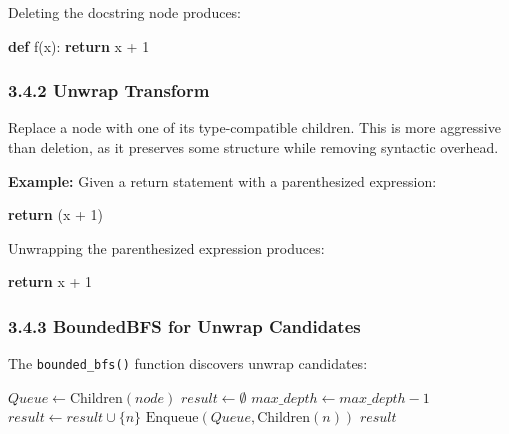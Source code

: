 \documentclass[
  letterpaper,
]{article}
\newenvironment{Shaded}{\begin{snugshade}}{\end{snugshade}}
\newcommand{\ControlFlowTok}[1]{\textcolor[rgb]{0.00,0.23,0.31}{\textbf{#1}}}
\newcommand{\DecValTok}[1]{\textcolor[rgb]{0.68,0.00,0.00}{#1}}
\newcommand{\KeywordTok}[1]{\textcolor[rgb]{0.00,0.23,0.31}{\textbf{#1}}}
\newcommand{\NormalTok}[1]{\textcolor[rgb]{0.00,0.23,0.31}{#1}}
\newcommand{\OperatorTok}[1]{\textcolor[rgb]{0.37,0.37,0.37}{#1}}
\begin{document}
Deleting the docstring node produces:

\begin{Shaded}
\begin{Highlighting}[]
\KeywordTok{def}\NormalTok{ f(x):}
    \ControlFlowTok{return}\NormalTok{ x }\OperatorTok{+} \DecValTok{1}
\end{Highlighting}
\end{Shaded}

\subsubsection{3.4.2 Unwrap Transform}\label{unwrap-transform}

Replace a node with one of its type-compatible children. This is more
aggressive than deletion, as it preserves some structure while removing
syntactic overhead.

\textbf{Example:} Given a return statement with a parenthesized
expression:

\begin{Shaded}
\begin{Highlighting}[]
\ControlFlowTok{return}\NormalTok{ (x }\OperatorTok{+} \DecValTok{1}\NormalTok{)}
\end{Highlighting}
\end{Shaded}

Unwrapping the parenthesized expression produces:

\begin{Shaded}
\begin{Highlighting}[]
\ControlFlowTok{return}\NormalTok{ x }\OperatorTok{+} \DecValTok{1}
\end{Highlighting}
\end{Shaded}

\subsubsection{3.4.3 BoundedBFS for Unwrap
Candidates}\label{boundedbfs-for-unwrap-candidates}

The \texttt{bounded\_bfs()} function discovers unwrap candidates:

\begin{algorithm}
\caption{BoundedBFS}
\begin{algorithmic}[1]
  \State $Queue \gets \text{Children}(node)$
  \State $result \gets \emptyset$
    \State $max\_depth \gets max\_depth - 1$
        \State $result \gets result \cup \{n\}$
      \EndIf
      \State $\text{Enqueue}(Queue, \text{Children}(n))$
    \EndFor
  \EndWhile
  \State \Return $result$
\EndProcedure
\end{algorithmic}
\end{algorithm}
\end{document}
